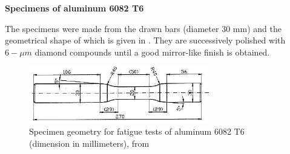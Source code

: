 \vspace{6pt}
\textbf{Specimens of aluminum 6082 T6}
\vspace{6pt}

The specimens were made from the drawn bars (diameter 30 mm) and the geometrical shape of which is given in . They are successively polished with $6-\mu m$ diamond compounds until a good mirror-like finish is obtained.
\begin{figure}[!h]
\centering
\includegraphics[width=0.7\textwidth]{figures//aluminum6082T6sample.png} 
\caption{Specimen geometry for fatigue tests of aluminum 6082 T6 (dimension in millimeters), from \cite{susmel2003multiaxial}}
\label{fig:aluminum6082T6}
\end{figure}


